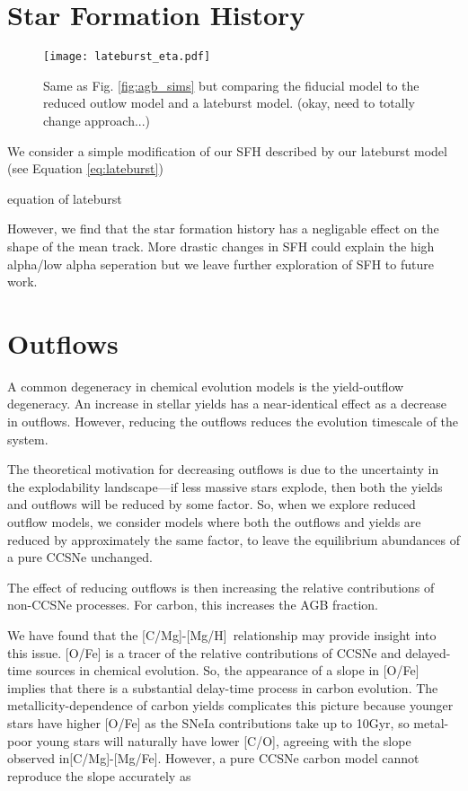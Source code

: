 \documentclass[12pt,oneside]{book}
\newcommand{\caah}{[C/Mg]-[Mg/H]}
\newcommand{\caafe}{[C/Mg]-[Mg/Fe]}
\begin{document}
\section{Star Formation History}

\begin{figure*}
\texttt{[image: lateburst\_eta.pdf]}

\caption{Same as Fig. \ref{fig:agb_sims} but comparing the fiducial model to the reduced outlow model and a lateburst model. (okay, need to totally change approach...)}
\end{figure*}

We consider a simple modification of our SFH described by our lateburst model
(see Equation \ref{eq:lateburst})

equation of lateburst

However, we find that the star formation history has a negligable effect on the shape of the mean track. More drastic changes in SFH could explain the high alpha/low alpha seperation but we leave further exploration of SFH to future work. 








\section{Outflows}
A common degeneracy in chemical evolution models is the yield-outflow degeneracy. An increase in stellar yields has a near-identical effect as a decrease in outflows. However, reducing the outflows reduces the evolution timescale of the system. 

The theoretical motivation for decreasing outflows is due to the uncertainty in the explodability landscape---if less massive stars explode, then both the yields and outflows will be reduced by some factor. So, when we explore reduced outflow models, we consider models where both the outflows and yields are reduced by approximately the same factor, to leave the equilibrium abundances of a pure CCSNe unchanged. 

The effect of reducing outflows is then increasing the relative contributions of non-CCSNe processes. For carbon, this increases the AGB fraction.

We have found that the \caah~relationship may provide insight into this issue. [O/Fe] is a tracer of the relative contributions of CCSNe and delayed-time sources in chemical evolution. So, the appearance of a slope in [O/Fe] implies that there is a substantial delay-time process in carbon evolution. 
The metallicity-dependence of carbon yields complicates this picture because
younger stars have higher [O/Fe] as the SNeIa contributions take up to 10Gyr,
so metal-poor young stars will naturally have lower [C/O], agreeing with the
slope observed in\caafe. However, a pure CCSNe carbon model cannot reproduce the slope accurately as  
\end{document}
